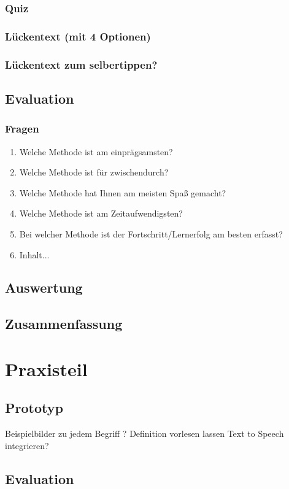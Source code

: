 \documentclass[a4paper, 12pt, twoside, BCOR=20mm, DIV=calc, abstracton, parskip=half*, toc=bibliography, toc=listof, headsepline, headings=small, numbers=enddot]{scrreprt} %
\begin{document}
\subsection{Quiz}
\subsection{Lückentext (mit 4 Optionen)}
\subsection{Lückentext zum selbertippen?}

\section{Evaluation}
\subsection{Fragen}
\begin{enumerate}
\item Welche Methode ist am einprägsamsten?
\item Welche Methode ist für zwischendurch?
\item Welche Methode hat Ihnen am meisten Spaß gemacht?
\item Welche Methode ist am Zeitaufwendigsten?
\item Bei welcher Methode ist der Fortschritt/Lernerfolg am besten erfasst?
\item Inhalt...
\end{enumerate}

\section{Auswertung}

\section{Zusammenfassung} 
\chapter{Praxisteil}
\section{Prototyp}
Beispielbilder zu jedem Begriff ? Definition vorlesen lassen Text to Speech integrieren?
\section{Evaluation}
\section{}


\printbibliography
\end{document}
